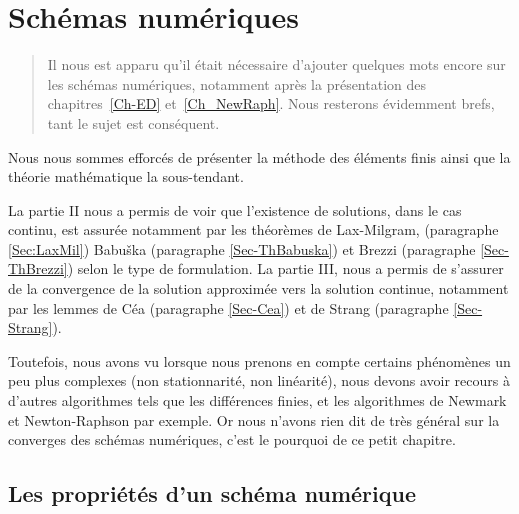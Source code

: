 \chapter{Schémas numériques}\label{Ch-shemanum}
\begin{abstract}
Il nous est apparu qu'il était nécessaire d'ajouter quelques mots encore sur les schémas numériques, notamment après la présentation des chapitres~\ref{Ch-ED} et~\ref{Ch_NewRaph}. Nous resterons évidemment brefs, tant le sujet est conséquent.
\end{abstract}


\medskip
Nous nous sommes efforcés de présenter la méthode des éléments finis ainsi que la théorie mathématique la sous-tendant.

La partie II nous a permis de voir que l'existence de solutions, dans le cas continu, est assurée notamment par les théorèmes de Lax-Milgram, (paragraphe \ref{Sec:LaxMil}) Babuška (paragraphe \ref{Sec-ThBabuska}) et Brezzi\label{Sec:Brezzi} (paragraphe \ref{Sec-ThBrezzi}) selon le type de formulation.
La partie III, nous a permis de s'assurer de la convergence de la solution approximée vers la solution continue, notamment par les lemmes de Céa (paragraphe \ref{Sec-Cea}) et de Strang (paragraphe \ref{Sec-Strang}).

Toutefois, nous avons vu lorsque nous prenons en compte certains phénomènes un peu plus complexes (non stationnarité, non linéarité), nous devons avoir recours à d'autres algorithmes tels que les différences finies, et les algorithmes de Newmark et Newton-Raphson par exemple. Or nous n'avons rien dit de très général sur la converges des schémas numériques, c'est le pourquoi de ce petit chapitre.


\medskip
\section{Les propriétés d'un schéma numérique}

\medskip
